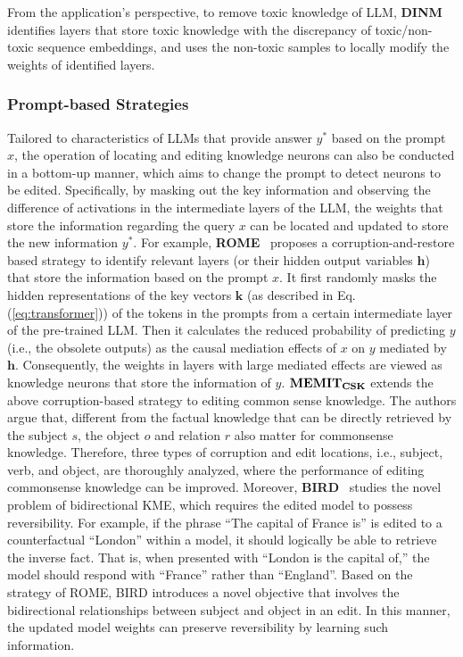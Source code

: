 \documentclass[acmsmall, screen]{acmart}
\begin{document}
{ From the application's perspective, to remove toxic knowledge of LLM, \textbf{DINM} \cite{wang2024detoxifying} identifies layers that store toxic knowledge with the discrepancy of toxic/non-toxic sequence embeddings, and uses the non-toxic samples to locally modify the weights of identified layers.}

\subsubsection{\textbf{Prompt-based Strategies}}

Tailored to characteristics of LLMs that provide answer $y^{*}$ based on the prompt $x$, the operation of locating and editing knowledge neurons can also be conducted in a bottom-up manner, which aims to change the prompt to detect neurons to be edited. Specifically, by masking out the key information and observing the difference of activations in the intermediate layers of the LLM, the weights that store the information regarding the query $x$ can be located and updated to store the new information $y^{*}$. For example, \textbf{ROME}~\cite{meng2022locating} proposes a corruption-and-restore based strategy to identify relevant layers (or their hidden output variables $\textbf{h}$) that store the information based on the prompt $x$. It first randomly masks the hidden representations of the key vectors $\mathbf{k}$ (as described in Eq. (\ref{eq:transformer})) of the tokens in the prompts from a certain intermediate layer of the pre-trained LLM. Then it calculates the reduced probability of predicting $y$ (i.e., the obsolete outputs) as the causal mediation effects of $x$ on $y$ mediated by $\textbf{h}$. Consequently, the weights in layers with large mediated effects are viewed as knowledge neurons that store the information of $y$. 
{
$\text{\textbf{MEMIT}}_{\text{\textbf{CSK}}}$ 
 \cite{gupta2023editing} extends the above corruption-based strategy to editing common sense knowledge. The authors argue that, different from the factual knowledge that can be directly retrieved by the subject $s$,
 the object $o$ and relation $r$ also matter for commonsense knowledge. Therefore, three types of corruption and edit locations, i.e., subject, verb, and object, are thoroughly analyzed, where the performance of editing commonsense knowledge can be improved. Moreover, \textbf{BIRD}~\cite{ma2023untying} studies the novel problem of bidirectional KME, which requires the edited model to possess reversibility. For example, 
if the phrase ``The capital of France is'' is edited to a counterfactual “London” within a model, it should logically be able to retrieve the inverse fact. That is, when presented with “London is the capital of,” the model should respond with “France” rather than “England”. Based on the strategy of ROME, BIRD introduces a novel objective that involves the bidirectional relationships between subject
and object in an edit. In this manner, the updated model weights can preserve reversibility by learning such information.
}
\end{document}
